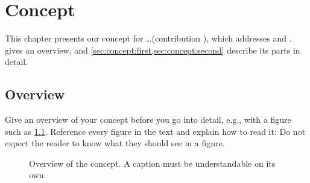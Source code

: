 \chapter{Concept}\label{chap:concept}

This chapter presents our concept for \ldots (contribution ), which addresses  and .
 gives an overview, and \cref{sec:concept:first,sec:concept:second} describe its parts in detail.

\section{Overview}\label{sec:concept:overview}

Give an overview of your concept before you go into detail, e.g., with a figure such as \cref{fig:concept:overview}.
Reference every figure in the text and explain how to read it:
Do not expect the reader to know what they should see in a figure.

\begin{figure}[htbp]
  \centering
  \caption[Overview of the concept]{Overview of the concept. A caption must be understandable on its own.}
  \label{fig:concept:overview}
\end{figure}

